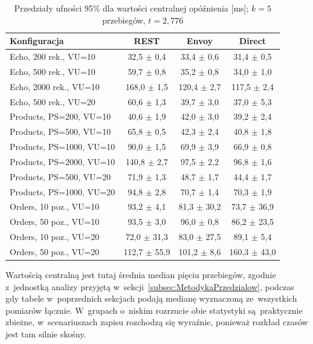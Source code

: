 \begin{table}[htb]
\centering
\footnotesize
\caption{Przedziały ufności 95\% dla wartości centralnej opóźnienia [ms]; $k=5$ przebiegów, $t=2{,}776$}
\label{tab:PrzedzialyCentralne}
\begin{tabular}{|l|c|c|c|}
\hline
\textbf{Konfiguracja} & \textbf{REST} & \textbf{Envoy} & \textbf{Direct} \\
\hline
Echo, 200 rek., VU=10      & 32,5 $\pm$ 0,4 & 33,4 $\pm$ 0,6 & 31,4 $\pm$ 0,5 \\
Echo, 500 rek., VU=10      & 59,7 $\pm$ 0,8 & 35,2 $\pm$ 0,8 & 34,0 $\pm$ 1,0 \\
Echo, 2000 rek., VU=10     & 168,0 $\pm$ 1,5 & 120,4 $\pm$ 2,7 & 117,5 $\pm$ 2,4 \\
Echo, 500 rek., VU=20      & 60,6 $\pm$ 1,3 & 39,7 $\pm$ 3,0 & 37,0 $\pm$ 5,3 \\
\hline
Products, PS=200, VU=10    & 40,6 $\pm$ 1,9 & 42,0 $\pm$ 3,0 & 39,2 $\pm$ 2,4 \\
Products, PS=500, VU=10    & 65,8 $\pm$ 0,5 & 42,3 $\pm$ 2,4 & 40,8 $\pm$ 1,8 \\
Products, PS=1000, VU=10   & 90,0 $\pm$ 1,5 & 69,9 $\pm$ 3,9 & 66,9 $\pm$ 0,8 \\
Products, PS=2000, VU=10   & 140,8 $\pm$ 2,7 & 97,5 $\pm$ 2,2 & 96,8 $\pm$ 1,6 \\
Products, PS=500, VU=20    & 71,9 $\pm$ 1,3 & 48,7 $\pm$ 1,7 & 44,4 $\pm$ 1,7 \\
Products, PS=1000, VU=20   & 94,8 $\pm$ 2,8 & 70,7 $\pm$ 1,4 & 70,3 $\pm$ 1,9 \\
\hline
Orders, 10 poz., VU=10     & 93,2 $\pm$ 4,1 & 81,3 $\pm$ 30,2 & 73,7 $\pm$ 36,9 \\
Orders, 50 poz., VU=10     & 93,5 $\pm$ 3,0 & 96,0 $\pm$ 0,8 & 86,2 $\pm$ 23,5 \\
Orders, 10 poz., VU=20     & 72,0 $\pm$ 31,3 & 83,0 $\pm$ 27,5 & 89,1 $\pm$ 5,4 \\
Orders, 50 poz., VU=20     & 112,7 $\pm$ 55,9 & 101,2 $\pm$ 8,6 & 160,3 $\pm$ 43,0 \\
\hline
\end{tabular}
\end{table}

Wartością centralną jest tutaj średnia median pięciu przebiegów, zgodnie z~jednostką analizy przyjętą w~sekcji~\ref{subsec:MetodykaPrzedzialow}, podczas gdy tabele w~poprzednich sekcjach podają medianę wyznaczoną ze~wszystkich pomiarów łącznie. W~grupach o~niskim rozrzucie obie statystyki są~praktycznie zbieżne, w~scenariuszach zapisu rozchodzą się wyraźnie, ponieważ rozkład czasów jest tam silnie skośny.

